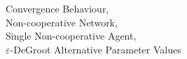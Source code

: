 \documentclass[a4paper, 12pt]{report}
\begin{document}
\begin{figure}[!htbp]
    \begin{minipage}{.45\linewidth}
    \centering
    \end{minipage}%
    \begin{minipage}{.45\linewidth}
    \centering
    \end{minipage}\par\medskip
    \centering
    
    \caption{Convergence Behaviour, \\ Non-cooperative Network, \\ Single Non-cooperative Agent, \\ $\varepsilon$-DeGroot Alternative Parameter Values}
\end{figure}
\end{document}

